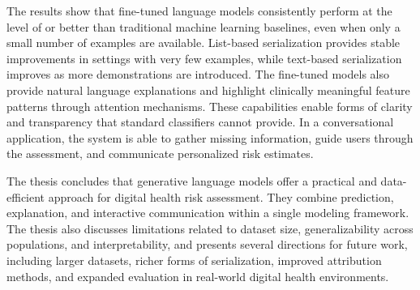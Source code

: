 The results show that fine-tuned language models consistently perform at the level of or better than traditional machine learning baselines, even when only a small number of examples are available. List-based serialization provides stable improvements in settings with very few examples, while text-based serialization improves as more demonstrations are introduced. The fine-tuned models also provide natural language explanations and highlight clinically meaningful feature patterns through attention mechanisms. These capabilities enable forms of clarity and transparency that standard classifiers cannot provide. In a conversational application, the system is able to gather missing information, guide users through the assessment, and communicate personalized risk estimates.

The thesis concludes that generative language models offer a practical and data-efficient approach for digital health risk assessment. They combine prediction, explanation, and interactive communication within a single modeling framework. The thesis also discusses limitations related to dataset size, generalizability across populations, and interpretability, and presents several directions for future work, including larger datasets, richer forms of serialization, improved attribution methods, and expanded evaluation in real-world digital health environments.
